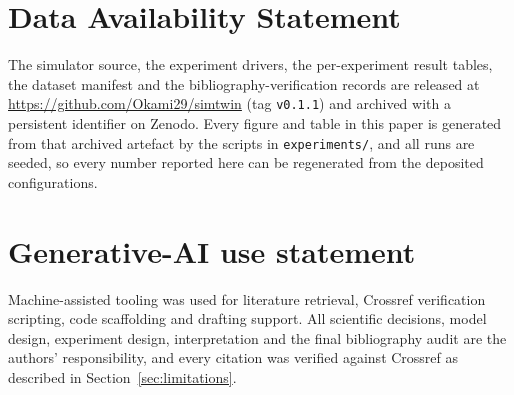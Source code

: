 \documentclass[preprint,12pt,authoryear,nopreprintline]{elsarticle}
\begin{document}
\section*{Data Availability Statement}
The simulator source, the experiment drivers, the per-experiment result tables,
the dataset manifest and the bibliography-verification records are released at
\url{https://github.com/Okami29/simtwin} (tag \texttt{v0.1.1}) and archived with a
persistent identifier on Zenodo. Every figure and table in this paper is
generated from that archived artefact by the scripts in \texttt{experiments/}, and
all runs are seeded, so every number reported here can be regenerated from the
deposited configurations.

\section*{Generative-AI use statement}
Machine-assisted tooling was used for literature retrieval, Crossref
verification scripting, code scaffolding and drafting support.
All scientific decisions, model design, experiment design, interpretation and the
final bibliography audit are the authors' responsibility, and every citation was
verified against Crossref as described in Section~\ref{sec:limitations}.



\end{document}
